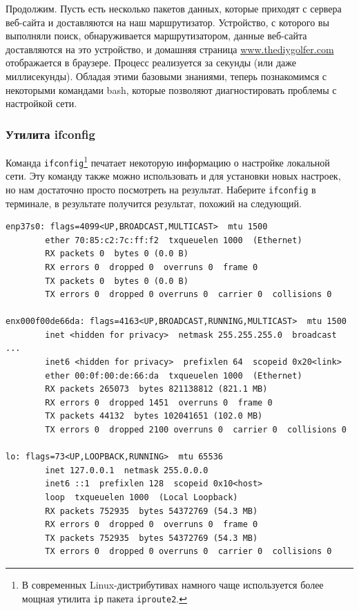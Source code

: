 \documentclass[12pt]{article}
\begin{document}
Продолжим. Пусть есть несколько
пакетов данных, которые приходят с сервера веб-сайта и доставляются на
наш маршрутизатор. Устройство, с которого вы выполняли поиск,
обнаруживается маршрутизатором, данные веб-сайта доставляются на это устройство, и
домашняя страница
\href{http://www.thediygolfer.com}{www.thediygolfer.com} отображается в
браузере. Процесс реализуется за секунды (или даже миллисекунды).
Обладая этими базовыми знаниями, теперь познакомимся с некоторыми
командами bash, которые позволяют диагностировать проблемы с настройкой сети.

\hypertarget{ifconfig}{%
\subsubsection{\texorpdfstring{\protect\hyperlink{ifconfig}{}Утилита
ifconfig}{Утилита ifconfig}}\label{ifconfig}}

Команда \texttt{ifconfig}\footnote{В современных Linux-дистрибутивах намного чаще используется более мощная утилита \texttt{ip} пакета \texttt{iproute2}.} печатает некоторую информацию о настройке локальной сети.
Эту команду также можно использовать и для
установки новых настроек, но нам достаточно просто посмотреть на
результат. Наберите \texttt{ifconfig} в терминале, в результате
получится результат, похожий на следующий.
\begin{verbatim}
enp37s0: flags=4099<UP,BROADCAST,MULTICAST>  mtu 1500
        ether 70:85:c2:7c:ff:f2  txqueuelen 1000  (Ethernet)
        RX packets 0  bytes 0 (0.0 B)
        RX errors 0  dropped 0  overruns 0  frame 0
        TX packets 0  bytes 0 (0.0 B)
        TX errors 0  dropped 0 overruns 0  carrier 0  collisions 0

enx000f00de66da: flags=4163<UP,BROADCAST,RUNNING,MULTICAST>  mtu 1500
        inet <hidden for privacy>  netmask 255.255.255.0  broadcast ...
        inet6 <hidden for privacy>  prefixlen 64  scopeid 0x20<link>
        ether 00:0f:00:de:66:da  txqueuelen 1000  (Ethernet)
        RX packets 265073  bytes 821138812 (821.1 MB)
        RX errors 0  dropped 1451  overruns 0  frame 0
        TX packets 44132  bytes 102041651 (102.0 MB)
        TX errors 0  dropped 2100 overruns 0  carrier 0  collisions 0

lo: flags=73<UP,LOOPBACK,RUNNING>  mtu 65536
        inet 127.0.0.1  netmask 255.0.0.0
        inet6 ::1  prefixlen 128  scopeid 0x10<host>
        loop  txqueuelen 1000  (Local Loopback)
        RX packets 752935  bytes 54372769 (54.3 MB)
        RX errors 0  dropped 0  overruns 0  frame 0
        TX packets 752935  bytes 54372769 (54.3 MB)
        TX errors 0  dropped 0 overruns 0  carrier 0  collisions 0
\end{verbatim}
\end{document}
